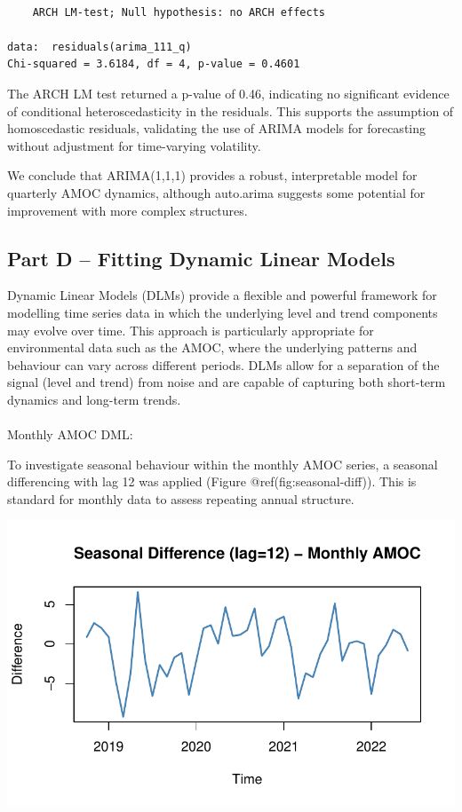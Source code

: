 \documentclass[
  11pt,
]{article}
\makeatletter
\let\oldparagraph\paragraph
\renewcommand{\paragraph}{
    \@ifstar
      \xxxParagraphStar
      \xxxParagraphNoStar
  }
\newcommand{\xxxParagraphStar}[1]{\oldparagraph*{#1}\mbox{}}
\newcommand{\xxxParagraphNoStar}[1]{\oldparagraph{#1}\mbox{}}
\makeatother
\begin{document}
\begin{verbatim}

    ARCH LM-test; Null hypothesis: no ARCH effects

data:  residuals(arima_111_q)
Chi-squared = 3.6184, df = 4, p-value = 0.4601
\end{verbatim}

The ARCH LM test returned a p-value of 0.46, indicating no significant
evidence of conditional heteroscedasticity in the residuals. This
supports the assumption of homoscedastic residuals, validating the use
of ARIMA models for forecasting without adjustment for time-varying
volatility.

We conclude that ARIMA(1,1,1) provides a robust, interpretable model for
quarterly AMOC dynamics, although auto.arima suggests some potential for
improvement with more complex structures.

\subsection{Part D -- Fitting Dynamic Linear
Models}\label{part-d-fitting-dynamic-linear-models}

Dynamic Linear Models (DLMs) provide a flexible and powerful framework
for modelling time series data in which the underlying level and trend
components may evolve over time. This approach is particularly
appropriate for environmental data such as the AMOC, where the
underlying patterns and behaviour can vary across different periods.
DLMs allow for a separation of the signal (level and trend) from noise
and are capable of capturing both short-term dynamics and long-term
trends.

\paragraph{Monthly AMOC DML:}\label{monthly-amoc-dml}

To investigate seasonal behaviour within the monthly AMOC series, a
seasonal differencing with lag 12 was applied (Figure
@ref(fig:seasonal-diff)). This is standard for monthly data to assess
repeating annual structure.

\includegraphics{project_files/figure-pdf/unnamed-chunk-51-1.pdf}
\end{document}
